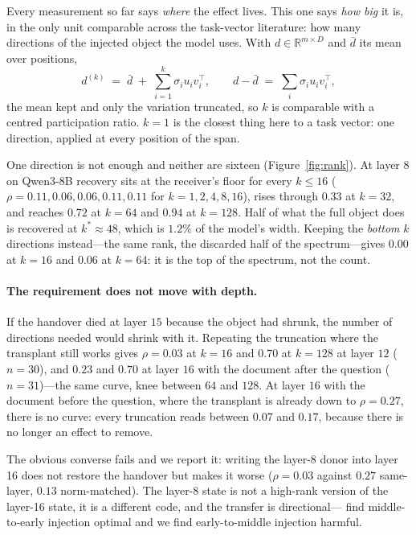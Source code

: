 \documentclass{article}
\newcommand{\dvec}{\ensuremath{d}}
\begin{document}
Every measurement so far says \emph{where} the effect lives. This one says
\emph{how big} it is, in the only unit comparable across the task-vector
literature: how many directions of the injected object the model uses. With
$\dvec \in \mathbb{R}^{m \times D}$ and $\bar{\dvec}$ its mean over positions,
\begin{equation}
\dvec^{(k)} \;=\; \bar{\dvec} \;+\; \sum_{i=1}^{k} \sigma_i u_i v_i^{\top},
\qquad
\dvec - \bar{\dvec} \;=\; \textstyle\sum_i \sigma_i u_i v_i^{\top},
\label{eq:rank}
\end{equation}
the mean kept and only the variation truncated, so $k$ is comparable with a
centred participation ratio. $k=1$ is the closest thing here to a task vector:
one direction, applied at every position of the span.

One direction is not enough and neither are sixteen
(Figure~\ref{fig:rank}). At layer $8$ on Qwen3-8B recovery sits at the
receiver's floor for every $k \le 16$ ($\rho = 0.11, 0.06, 0.06, 0.11, 0.11$ for
$k = 1,2,4,8,16$), rises through $0.33$ at $k=32$, and reaches $0.72$ at $k=64$
and $0.94$ at $k=128$. Half of what the full object does is recovered at
$k^{*}\approx 48$, which is $1.2\%$ of the model's width. Keeping the
\emph{bottom} $k$ directions instead---the same rank, the discarded half of the
spectrum---gives $0.00$ at $k=16$ and $0.06$ at $k=64$: it is the top of the
spectrum, not the count.

\paragraph{The requirement does not move with depth.} If the handover died at
layer $15$ because the object had shrunk, the number of directions needed would
shrink with it. Repeating the truncation where the transplant still works gives
$\rho = 0.03$ at $k=16$ and $0.70$ at $k=128$ at layer $12$ ($n=30$), and $0.23$
and $0.70$ at layer $16$ with the document after the question ($n=31$)---the
same curve, knee between $64$ and $128$. At layer $16$ with the document before
the question, where the transplant is already down to $\rho=0.27$, there is no
curve: every truncation reads between $0.07$ and $0.17$, because there is no
longer an effect to remove.

The obvious converse fails and we report it: writing the layer-8 donor into
layer 16 does not restore the handover but makes it worse ($\rho = 0.03$ against
$0.27$ same-layer, $0.13$ norm-matched). The layer-8 state is not a high-rank
version of the layer-16 state, it is a different code, and the transfer is
directional---\citet{ardoin2026promptcompression} find middle-to-early injection
optimal and we find early-to-middle injection harmful.
\end{document}
